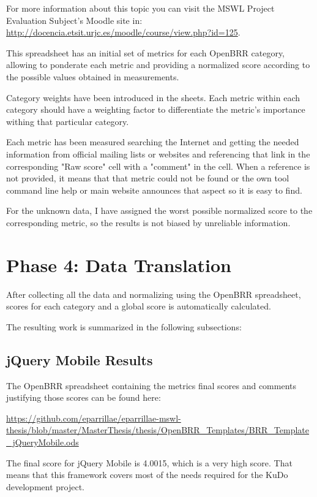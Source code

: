 \documentclass[a4paper,12pt]{book}
\begin{document}
For more information about this topic you can visit the MSWL Project Evaluation Subject's Moodle site in:\\
\url{http://docencia.etsit.urjc.es/moodle/course/view.php?id=125}. 

This spreadsheet has an initial set of metrics for each OpenBRR category, allowing to ponderate each metric and providing a normalized score according to the possible values obtained in measurements.

Category weights have been introduced in the sheets. Each metric within each category should have a weighting factor to differentiate the metric's importance withing that particular category. 

Each metric has been measured searching the Internet and getting the needed information from official mailing lists or websites and referencing that link in the corresponding "Raw score" cell with a "comment" in the cell. When a reference is not provided, it means that that metric could not be found or the own tool command line help or main website announces that aspect so it is easy to find.

For the unknown data, I have assigned the worst possible normalized score to the corresponding metric, so the results is not biased by unreliable information.

\section{Phase 4: Data Translation}
\label{sec:phase4}

After collecting all the data and normalizing using the OpenBRR spreadsheet, scores for each category and a global score is automatically calculated.

The resulting work is summarized in the following subsections:

\subsection{jQuery Mobile Results}
\label{jQuery Mobile Results}

The OpenBRR spreadsheet containing the metrics final scores and comments justifying those scores can be found here:

\url{
https://github.com/eparrillae/eparrillae-mswl-thesis/blob/master/MasterThesis/thesis/OpenBRR_Templates/BRR_Template_jQueryMobile.ods}

The final score for jQuery Mobile is 4.0015, which is a very high score. That means that this framework covers most of the needs required for the KuDo development project.
\end{document}

